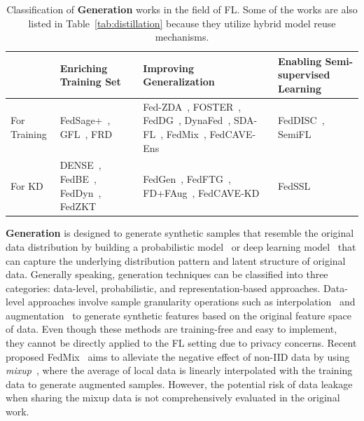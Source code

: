 \begin{table}[t]
  \centering
  \footnotesize
  \caption{Classification of \textbf{Generation} works in the field of FL. Some of the works are also listed in Table~\ref{tab:distillation} because they utilize hybrid model reuse mechanisms.}
  \label{tab:generation}

  \begin{tabular}{|l|p{3.1cm}|p{5cm}|p{4cm}|}
    \hline
    & Enriching Training Set & Improving Generalization  & Enabling Semi-supervised Learning  \\ \hline
    \multicolumn{1}{|l|}{For Training} & FedSage+~\cite{zhang2021subgraph}, GFL~\cite{cheng2023gfl}, \newline FRD~\cite{cha2019federated} & Fed-ZDA~\cite{hao2021towards}, FOSTER~\cite{yu2023turning}, FedDG~\cite{liu2021feddg}, DynaFed~\cite{pi2022dynafed}, SDA-FL~\cite{liz2022federated}, FedMix~\cite{yoon2021fedmix}, \newline FedCAVE-Ens~\cite{heinbaugh2023data} & FedDISC~\cite{yang2023exploring}, SemiFL~\cite{diao2022semifl}  \\ \hline
    \multicolumn{1}{|l|}{For KD} & DENSE~\cite{zhang2022dense}, FedBE~\cite{chen2020fedbe}, \newline FedDyn~\cite{jin2023feddyn}, FedZKT~\cite{zhang2022fedzkt} & FedGen~\cite{zhu2021data}, FedFTG~\cite{zhang2022fine}, FD+FAug~\cite{jeong2018communication}, \newline FedCAVE-KD~\cite{heinbaugh2023data} & FedSSL~\cite{fan2022private} \\ \hline
  \end{tabular}
\end{table}

\textbf{Generation} is designed to generate synthetic samples that resemble the original data distribution by building a probabilistic model~\cite{geyer1992practical} or deep learning model~\cite{kingma2014auto, goodfellow2020generative, cao2022survey} that can capture the underlying distribution pattern and latent structure of original data.
Generally speaking, generation techniques can be classified into three categories: data-level, probabilistic, and representation-based approaches.
Data-level approaches involve sample granularity operations such as interpolation~\cite{chawla2002smote, zhangmixup} and augmentation~\cite{wong2016understanding} to generate synthetic features based on the original feature space of data.
Even though these methods are training-free and easy to implement, they cannot be directly applied to the FL setting due to privacy concerns.
Recent proposed FedMix~\cite{yoon2021fedmix} aims to alleviate the negative effect of non-IID data by using \textit{mixup}~\cite{zhangmixup}, where the average of local data is linearly interpolated with the training data to generate augmented samples.
However, the potential risk of data leakage when sharing the mixup data is not comprehensively evaluated in the original work.

